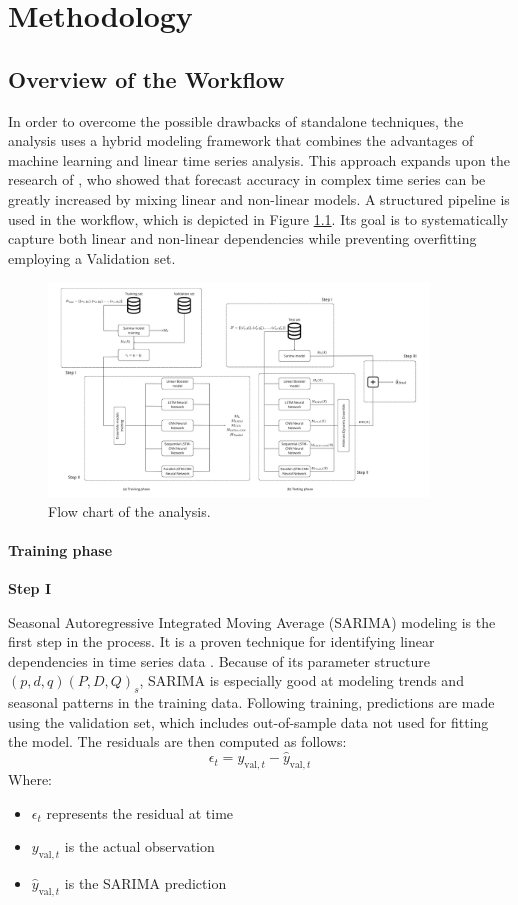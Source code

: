 \chapter{Methodology}
\section{Overview of the Workflow}
In order to overcome the possible drawbacks of standalone techniques, the analysis uses a hybrid modeling framework that combines the advantages of machine learning and linear time series analysis. This approach expands upon the research of \cite{zhang2003hybrid}, who showed that forecast accuracy in complex time series can be greatly increased by mixing linear and non-linear models. A structured pipeline is used in the workflow, which is depicted in Figure \ref{fig:Flow chart}. Its goal is to systematically capture both linear and non-linear dependencies while preventing overfitting employing a Validation set.
\begin{figure}[H]
    \centering
    \includegraphics[width=0.90\textwidth]{Machine_learning_thesis/Images/Flow_chart.png}
    \caption{Flow chart of the analysis.} 
    \label{fig:Flow chart}
\end{figure}

\subsubsection{Training phase}
\textbf{Step I}

Seasonal Autoregressive Integrated Moving Average (SARIMA) modeling is the first step in the process. It is a proven technique for identifying linear dependencies in time series data \cite{Hyndman2018}. Because of its parameter structure $(p, d, q)(P, D, Q)_s$, SARIMA is especially good at modeling trends and seasonal patterns in the training data. Following training, predictions are made using the validation set, which includes out-of-sample data not used for fitting the model. The residuals are then computed as follows:
\[
\epsilon_t = y_{\text{val},t} - \hat{y}_{\text{val},t}
\]
Where:
\begin{itemize}
    \item \(\epsilon_t\) represents the residual at time
    \item \(y_{\text{val},t}\) is the actual observation
    \item \(\hat{y}_{\text{val},t}\) is the SARIMA prediction
\end{itemize}

